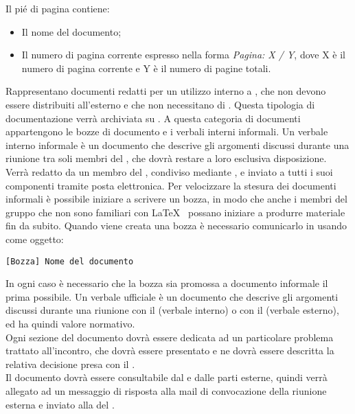 Il pié di pagina contiene:
\begin{itemize}
\item Il nome del documento;
\item Il numero di pagina corrente espresso nella forma \textit{Pagina: X / Y}, dove X è il numero di pagina corrente e Y è il numero di pagine totali.
\end{itemize}
Rappresentano documenti redatti per un utilizzo interno a \gruppo, che non devono essere distribuiti all'esterno e
che non necessitano di . Questa tipologia di documentazione verrà archiviata su .
A questa categoria di documenti appartengono le bozze di documento e i verbali interni informali.
Un verbale interno informale è un documento che descrive gli argomenti discussi durante una riunione tra soli membri del , che dovrà restare a loro esclusiva disposizione. Verrà redatto da un membro del , condiviso mediante , e inviato a tutti i suoi componenti tramite posta elettronica.
Per velocizzare la stesura dei documenti informali è possibile iniziare a scrivere un bozza,
in  modo che anche i membri del gruppo che non sono familiari con \LaTeX~ possano iniziare a produrre materiale fin da subito.
Quando viene creata una bozza è necessario comunicarlo in  usando come oggetto:
\begin{center}
\texttt{[Bozza] Nome del documento}
\end{center}
In ogni caso è necessario che la bozza sia promossa a documento informale il prima possibile.
\label{verbaliUfficiali}
Un verbale ufficiale è un documento che descrive gli argomenti discussi durante una riunione con il  (verbale interno) o con il  (verbale esterno), ed ha quindi valore normativo.
\\Ogni sezione del documento dovrà essere dedicata ad un particolare problema trattato all'incontro, che dovrà essere presentato e ne dovrà essere descritta la relativa decisione presa con il .
\\Il documento dovrà essere consultabile dal  e dalle parti esterne, quindi verrà allegato ad un messaggio di risposta alla mail di convocazione della riunione esterna e inviato alla  del .
